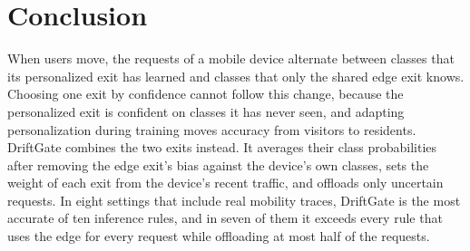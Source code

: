 \section{Conclusion}
\label{sec:conclusion}

When users move, the requests of a mobile device alternate between classes that its personalized exit has learned and classes that only the shared edge exit knows. Choosing one exit by confidence cannot follow this change, because the personalized exit is confident on classes it has never seen, and adapting personalization during training moves accuracy from visitors to residents. DriftGate combines the two exits instead. It averages their class probabilities after removing the edge exit's bias against the device's own classes, sets the weight of each exit from the device's recent traffic, and offloads only uncertain requests. In eight settings that include real mobility traces, DriftGate is the most accurate of ten inference rules, and in seven of them it exceeds every rule that uses the edge for every request while offloading at most half of the requests. 

